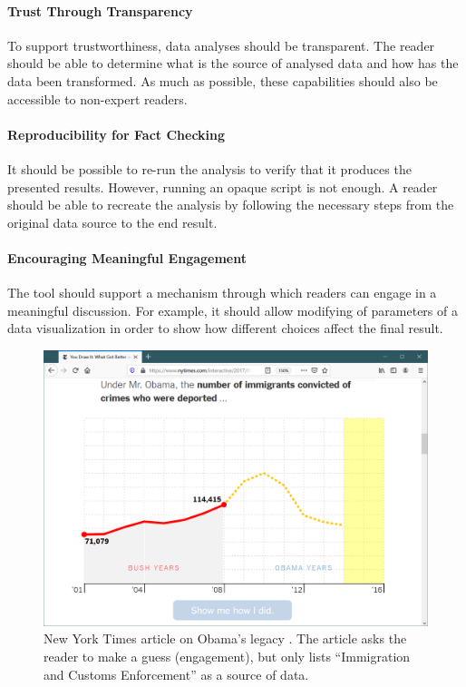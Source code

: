 \documentclass[manuscript,review,anonymous]{acmart}
\begin{document}
\paragraph{Trust Through Transparency}
To support trustworthiness, data analyses should be transparent. The reader should be able to
determine what is the source of analysed data and how has the data been transformed. As much as
possible, these capabilities should also be accessible to non-expert readers.

\paragraph{Reproducibility for Fact Checking}
It should be possible to re-run the analysis to verify that it produces the presented results.
However, running an opaque script is not enough. A reader should be able to recreate the analysis
by following the necessary steps from the original data source to the end result.

\paragraph{Encouraging Meaningful Engagement}
The tool should support a mechanism through which readers can engage in a meaningful discussion.
For example, it should allow modifying of parameters of a data visualization in order to show
how different choices affect the final result.

\begin{figure}
\includegraphics[width=1\columnwidth]{figures/nyt}
\caption{New York Times article on Obama's legacy \cite{youdraw}. The article asks the reader to make a guess
(engagement), but only lists ``Immigration and Customs Enforcement'' as a source of data.}
\label{fig:nyt}
\end{figure}
\end{document}
